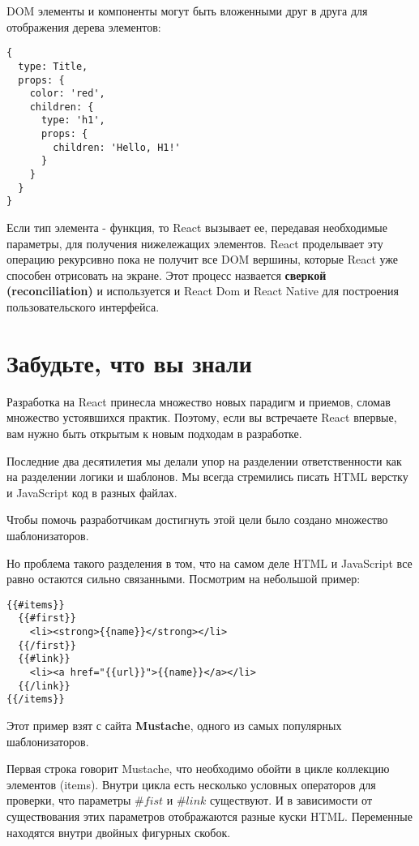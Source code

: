 DOM элементы и компоненты могут быть вложенными друг в друга для отображения дерева элементов:

\begin{lstlisting}
{
  type: Title,
  props: {
    color: 'red',
    children: {
      type: 'h1',
      props: {
        children: 'Hello, H1!'
      }
    } 
  }
}
\end{lstlisting}

Если тип элемента - функция, то React вызывает ее, передавая необходимые параметры, для получения нижележащих элементов. React проделывает эту операцию рекурсивно пока не получит все DOM вершины, которые React уже способен отрисовать на экране. Этот процесс назвается \textbf{сверкой (reconciliation)} и используется и React Dom и React Native для построения пользовательского интерфейса.


\section{Забудьте, что вы знали}	

Разработка на React принесла множество новых парадигм и приемов, сломав множество устоявшихся практик. Поэтому, если вы встречаете React впервые, вам нужно быть открытым к новым подходам в разработке.

Последние два десятилетия мы делали упор на разделении ответственности как на разделении логики и шаблонов. Мы всегда стремились писать HTML верстку и JavaScript код в разных файлах. 

Чтобы помочь разработчикам достигнуть этой цели было создано множество шаблонизаторов. 

Но проблема такого разделения в том, что на самом деле HTML и JavaScript все равно остаются сильно связанными. Посмотрим на небольшой пример:

\begin{lstlisting}
{{#items}}
  {{#first}}
    <li><strong>{{name}}</strong></li>
  {{/first}}
  {{#link}}
    <li><a href="{{url}}">{{name}}</a></li>
  {{/link}}
{{/items}}
\end{lstlisting}

Этот пример взят с сайта \textbf{Mustache}, одного из самых популярных шаблонизаторов.

Первая строка говорит Mustache, что необходимо обойти в цикле коллекцию элементов (items). Внутри цикла есть несколько условных операторов для проверки, что параметры $\#fist$ и $\#link$ существуют. И в зависимости от существования этих параметров отображаются разные куски HTML. Переменные находятся внутри двойных фигурных скобок.


